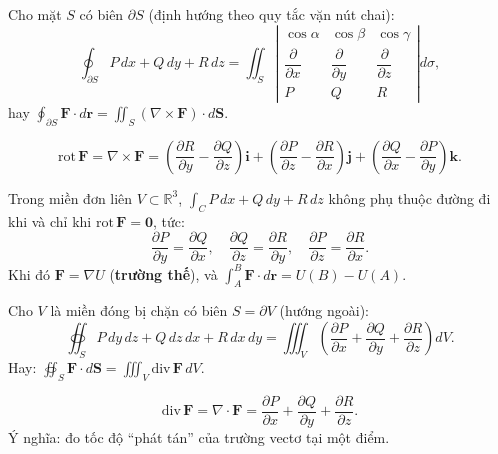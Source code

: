 \documentclass[12pt,a4paper]{article}
\begin{document}
\begin{dinhly}[title={Công thức Stokes}]
  Cho mặt $S$ có biên $\partial S$ (định hướng theo quy tắc vặn nút chai):
  \[
    \oint_{\partial S} P\,dx + Q\,dy + R\,dz = \iint_S \left|\begin{array}{ccc} \cos\alpha & \cos\beta & \cos\gamma \\ \dfrac{\partial}{\partial x} & \dfrac{\partial}{\partial y} & \dfrac{\partial}{\partial z} \\[4pt] P & Q & R \end{array}\right| d\sigma,
  \]
  hay $\displaystyle\oint_{\partial S} \mathbf{F} \cdot d\mathbf{r} = \iint_S (\nabla \times \mathbf{F}) \cdot d\mathbf{S}$.
\end{dinhly}

\begin{dinhnghia}[title={Vectơ rota (curl)}]
  \[
    \text{rot}\,\mathbf{F} = \nabla \times \mathbf{F} = \left(\dfrac{\partial R}{\partial y} - \dfrac{\partial Q}{\partial z}\right)\mathbf{i} + \left(\dfrac{\partial P}{\partial z} - \dfrac{\partial R}{\partial x}\right)\mathbf{j} + \left(\dfrac{\partial Q}{\partial x} - \dfrac{\partial P}{\partial y}\right)\mathbf{k}.
  \]
\end{dinhnghia}

\begin{dinhly}[title={TP đường trong không gian không phụ thuộc đường đi}]
  Trong miền đơn liên $V \subset \mathbb{R}^3$, $\displaystyle\int_C P\,dx + Q\,dy + R\,dz$ không phụ thuộc đường đi khi và chỉ khi $\text{rot}\,\mathbf{F} = \mathbf{0}$, tức:
  \[
    \dfrac{\partial P}{\partial y} = \dfrac{\partial Q}{\partial x},\quad \dfrac{\partial Q}{\partial z} = \dfrac{\partial R}{\partial y},\quad \dfrac{\partial P}{\partial z} = \dfrac{\partial R}{\partial x}.
  \]
  Khi đó $\mathbf{F} = \nabla U$ (\textbf{trường thế}), và $\displaystyle\int_A^B \mathbf{F}\cdot d\mathbf{r} = U(B) - U(A)$.
\end{dinhly}

\begin{dinhly}[title={Công thức Ostrogradsky--Gauss}]
  Cho $V$ là miền đóng bị chặn có biên $S = \partial V$ (hướng ngoài):
  \[
    \oiint_S P\,dy\,dz + Q\,dz\,dx + R\,dx\,dy = \iiint_V \left(\dfrac{\partial P}{\partial x} + \dfrac{\partial Q}{\partial y} + \dfrac{\partial R}{\partial z}\right)dV.
  \]
  Hay: $\displaystyle\oiint_S \mathbf{F} \cdot d\mathbf{S} = \iiint_V \text{div}\,\mathbf{F}\,dV$.
\end{dinhly}

\begin{dinhnghia}[title={Divergence}]
  \[
    \text{div}\,\mathbf{F} = \nabla \cdot \mathbf{F} = \dfrac{\partial P}{\partial x} + \dfrac{\partial Q}{\partial y} + \dfrac{\partial R}{\partial z}.
  \]
  Ý nghĩa: đo tốc độ ``phát tán'' của trường vectơ tại một điểm.
\end{dinhnghia}
\end{document}
